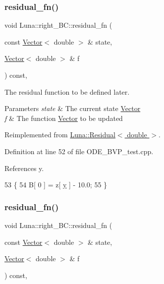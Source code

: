 \subsubsection{\texorpdfstring{residual\+\_\+fn()}{residual\_fn()}\hspace{0.1cm}{\footnotesize\ttfamily [1/2]}}
{\footnotesize\ttfamily void Luna\+::right\+\_\+\+B\+C\+::residual\+\_\+fn (\begin{DoxyParamCaption}\item[{const \hyperlink{classLuna_1_1Vector}{Vector}$<$ double $>$ \&}]{state,  }\item[{\hyperlink{classLuna_1_1Vector}{Vector}$<$ double $>$ \&}]{f }\end{DoxyParamCaption}) const\hspace{0.3cm}{\ttfamily [inline]}, {\ttfamily [virtual]}}



The residual function to be defined later. 


\begin{DoxyParams}{Parameters}
{\em state} & The current state \hyperlink{classLuna_1_1Vector}{Vector} \\
\hline
{\em f} & The function \hyperlink{classLuna_1_1Vector}{Vector} to be updated \\
\hline
\end{DoxyParams}


Reimplemented from \hyperlink{classLuna_1_1Residual_ae1b1ebe3314c788b176bcac7b328de5c}{Luna\+::\+Residual$<$ double $>$}.



Definition at line 52 of file O\+D\+E\+\_\+\+B\+V\+P\+\_\+test.\+cpp.



References y.


\begin{DoxyCode}
53         \{
54             B[ 0 ] = z[ \hyperlink{ODE__BVP__test_8cpp_adf764cbdea00d65edcd07bb9953ad2b7ae1f9fdb8b786c63efc4ce44eeacd17f2}{y} ] - 10.0;
55         \}
\end{DoxyCode}
\mbox{\label{classLuna_1_1right__BC_a513bb865a218a9ee309727839496afe0}} 
\subsubsection{\texorpdfstring{residual\+\_\+fn()}{residual\_fn()}\hspace{0.1cm}{\footnotesize\ttfamily [2/2]}}
{\footnotesize\ttfamily void Luna\+::right\+\_\+\+B\+C\+::residual\+\_\+fn (\begin{DoxyParamCaption}\item[{const \hyperlink{classLuna_1_1Vector}{Vector}$<$ double $>$ \&}]{state,  }\item[{\hyperlink{classLuna_1_1Vector}{Vector}$<$ double $>$ \&}]{f }\end{DoxyParamCaption}) const\hspace{0.3cm}{\ttfamily [inline]}, {\ttfamily [virtual]}}



